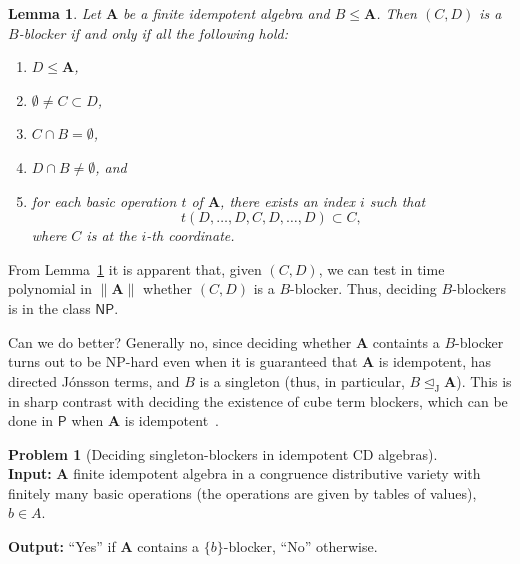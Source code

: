 \documentclass{amsart}
\theoremstyle{plain}
\newtheorem{lemma}[theorem]{Lemma}
\theoremstyle{definition}
\newtheorem{problem}[theorem]{Problem}
\begin{document}
\begin{lemma}\label{lemBblockers}
  Let ${{\mathbf{A}}}$ be a finite idempotent algebra and $B\leq {{\mathbf{A}}}$. Then $(C,D)$ is a
  $B$-blocker if and only if all the following hold:
\begin{enumerate}
  \item $D \leq {{\mathbf{A}}}$,
  \item $\emptyset\neq C\subset D$,
  \item $C\cap B=\emptyset$,
  \item $D\cap B\neq\emptyset$, and
  \item\label{itmIndices}for each basic operation $t$ of ${{\mathbf{A}}}$, there exists an index $i$ such
    that 
    \[
      t(D,\dots,D,C,D,\dots,D)\subset C,
    \]
    where  $C$ is at the $i$-th coordinate.
\end{enumerate}
\end{lemma}

From Lemma~\ref{lemBblockers} it is apparent that, given
$(C,D)$, we can test in time polynomial in $\|{{\mathbf{A}}}\|$ whether $(C,D)$ is a $B$-blocker. 
Thus, deciding $B$-blockers is in the class
${{\textsf{NP}}}$.

Can we do better? Generally no, since deciding whether ${{\mathbf{A}}}$ containts a
$B$-blocker turns out to be {{\textsf{NP}}}-hard even when it is guaranteed that ${{\mathbf{A}}}$ is idempotent, has directed J\'onsson terms, and $B$ is a singleton (thus, in particular, $B\operatorname{\trianglelefteq_J} {{\mathbf{A}}}$). This is in sharp contrast
with deciding the existence of cube term blockers, which can be done in
${{\textsf{P}}}$ when ${{\mathbf{A}}}$ is idempotent~\cite{zhuk-kazda}.

\begin{problem}[Deciding singleton-blockers in idempotent CD algebras]\ \\
{\bf Input:} ${{\mathbf{A}}}$ finite idempotent algebra in a congruence distributive variety with
finitely many basic operations (the operations are given by tables of values),
$b\in A$.

\noindent
{\bf Output:} ``Yes'' if ${{\mathbf{A}}}$ contains a $\{b\}$-blocker, ``No'' otherwise.
\end{problem}
\end{document}
